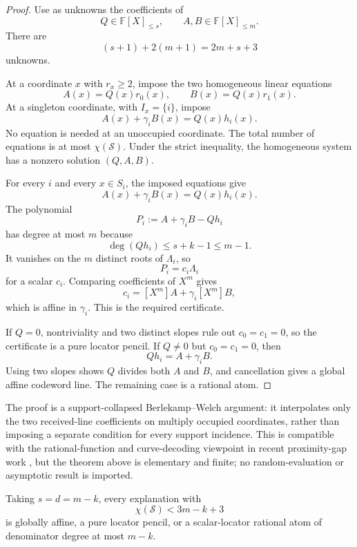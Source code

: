 \documentclass[11pt,a4paper]{amsart}
\numberwithin{equation}{section}
\theoremstyle{remark}
\newcommand{\F}{\mathbb F}\newcommand{\B}{\mathbb B}\newcommand{\K}{\mathbb K}\newcommand{\Z}{\mathbb Z}
\newcommand{\cS}{\mathcal S}\newcommand{\cZ}{\mathcal Z}
\begin{document}
\begin{proof}
Use as unknowns the coefficients of
\[
 Q\in\F[X]_{\le s},
 \qquad
 A,B\in\F[X]_{\le m}.
\]
There are
\[
 (s+1)+2(m+1)=2m+s+3
\]
unknowns.

At a coordinate $x$ with $r_x\ge2$, impose the two homogeneous linear equations
\[
 A(x)=Q(x)r_0(x),
 \qquad
 B(x)=Q(x)r_1(x).
\]
At a singleton coordinate, with $I_x=\{i\}$, impose
\[
 A(x)+\gamma_iB(x)=Q(x)h_i(x).
\]
No equation is needed at an unoccupied coordinate.  The total number of equations is at most $\chi(\cS)$.  Under the strict inequality, the homogeneous system has a nonzero solution $(Q,A,B)$.

For every $i$ and every $x\in S_i$, the imposed equations give
\[
 A(x)+\gamma_iB(x)=Q(x)h_i(x).
\]
The polynomial
\[
 P_i:=A+\gamma_iB-Qh_i
\]
has degree at most $m$ because
\[
 \deg(Qh_i)\le s+k-1\le m-1.
\]
It vanishes on the $m$ distinct roots of $\Lambda_i$, so
\[
 P_i=c_i\Lambda_i
\]
for a scalar $c_i$.  Comparing coefficients of $X^m$ gives
\[
 c_i=[X^m]A+\gamma_i[X^m]B,
\]
which is affine in $\gamma_i$.  This is the required certificate.

If $Q=0$, nontriviality and two distinct slopes rule out $c_0=c_1=0$, so the certificate is a pure locator pencil.  If $Q\ne0$ but $c_0=c_1=0$, then
\[
 Qh_i=A+\gamma_iB.
\]
Using two slopes shows $Q$ divides both $A$ and $B$, and cancellation gives a global affine codeword line.  The remaining case is a rational atom.
\end{proof}

\begin{remark}
The proof is a support-collapsed Berlekamp--Welch argument: it interpolates only the two received-line coefficients on multiply occupied coordinates, rather than imposing a separate condition for every support incidence.  This is compatible with the rational-function and curve-decoding viewpoint in recent proximity-gap work \cite{BSCHKS25,GG26}, but the theorem above is elementary and finite; no random-evaluation or asymptotic result is imported.
\end{remark}

\begin{corollary}\label{cor:full-profile}
Taking $s=d=m-k$, every explanation with
\[
 \boxed{
 \chi(\cS)<3m-k+3
 }
\]
is globally affine, a pure locator pencil, or a scalar-locator rational atom of denominator degree at most $m-k$.
\end{corollary}
\end{document}
